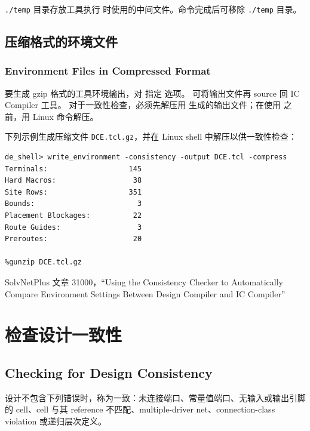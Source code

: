 \begin{noteBox}
\texttt{./temp} 目录存放工具执行  时使用的中间文件。命令完成后可移除 \texttt{./temp} 目录。
\end{noteBox}

\subsection{压缩格式的环境文件}
\subsubsection*{Environment Files in Compressed Format}

要生成 gzip 格式的工具环境输出，对  指定  选项。
可将输出文件再 source 回 IC Compiler 工具。
对于一致性检查，必须先解压用  生成的输出文件；在使用  之前，用 Linux  命令解压。

下列示例生成压缩文件 \texttt{DCE.tcl.gz}，并在 Linux shell 中解压以供一致性检查：
\begin{lstlisting}
de_shell> write_environment -consistency -output DCE.tcl -compress
Terminals:                   145
Hard Macros:                  38
Site Rows:                   351
Bounds:                        3
Placement Blockages:          22
Route Guides:                  3
Preroutes:                    20

%gunzip DCE.tcl.gz
\end{lstlisting}

\begin{seeAlsoBox}
SolvNetPlus 文章 31000，``Using the Consistency Checker to Automatically Compare Environment Settings Between Design Compiler and IC Compiler''
\end{seeAlsoBox}

\section{检查设计一致性}
\subsection*{Checking for Design Consistency}

设计不包含下列错误时，称为一致：未连接端口、常量值端口、无输入或输出引脚的 cell、cell 与其 reference 不匹配、multiple-driver net、connection-class violation 或递归层次定义。

